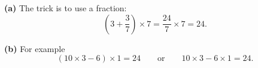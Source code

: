 \textbf{(a)} The trick is to use a fraction:
\[\left(3+\dfrac{3}{7}\right)\times7=\dfrac{24}{7}\times7=\boxed{24}.\]

\textbf{(b)} For example
\[(10\times3-6)\times1=\boxed{24}\qquad\text{or}\qquad10\times3-6\times1=24 .\]
